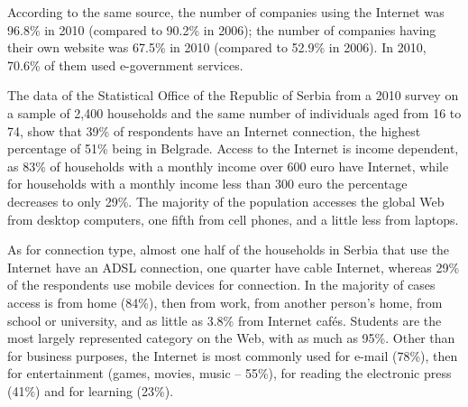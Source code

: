 {\begin{multicols}{2}

According to the same source, the number of companies using the Internet was 96.8\% in 2010 (compared to 90.2\% in 2006); the number of companies having their own website was 67.5\% in 2010 (compared to 52.9\% in 2006).  In 2010, 70.6\% of them used e-government services. 

The data of the Statistical Office of the Republic of Serbia from a 2010 survey on a sample of 2,400 households and the same number of individuals aged from 16 to 74, show that 39\% of respondents have an Internet connection, the highest percentage of 51\% being in Belgrade. \cite{ICT2010} Access to the Internet is income dependent, as 83\% of households with a monthly income over 600 euro have Internet, while for households with a monthly income less than 300 euro the percentage decreases to only 29\%. The majority of the population accesses the global Web from desktop computers, one fifth from cell phones, and a little less from laptops. 

As for connection type, almost one half of the households in Serbia that use the Internet have an ADSL connection, one quarter have cable Internet, whereas 29\% of the respondents use mobile devices for connection. In the majority of cases access is from home (84\%), then from work, from another person’s home, from school or university, and as little as 3.8\% from Internet caf\'es. Students are the most largely represented category on the Web, with as much as 95\%. Other than for business purposes, the Internet is most commonly used for e-mail (78\%), then for entertainment (games, movies, music – 55\%), for reading the electronic press (41\%) and for learning (23\%). 


\end{multicols}}
